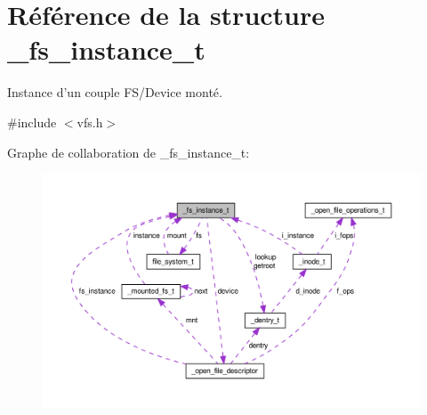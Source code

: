 \hypertarget{struct__fs__instance__t}{\section{Référence de la structure \-\_\-fs\-\_\-instance\-\_\-t}
\label{struct__fs__instance__t}
}


Instance d'un couple F\-S/\-Device monté.  




{\ttfamily \#include $<$vfs.\-h$>$}



Graphe de collaboration de \-\_\-fs\-\_\-instance\-\_\-t\-:
\nopagebreak
\begin{figure}[H]
\begin{center}
\leavevmode
\includegraphics[width=350pt]{struct__fs__instance__t__coll__graph}
\end{center}
\end{figure}
